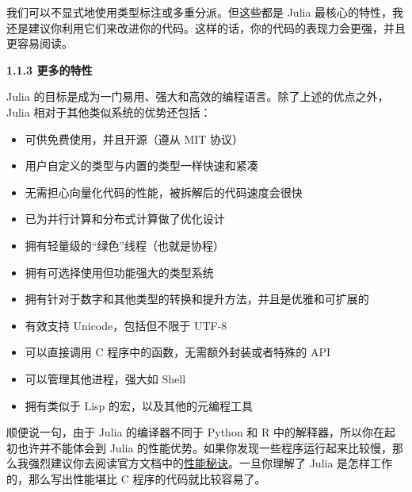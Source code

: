 我们可以不显式地使用类型标注或多重分派。但这些都是 Julia 最核心的特性，我还是建议你利用它们来改进你的代码。这样的话，你的代码的表现力会更强，并且更容易阅读。

\textbf{1.1.3 更多的特性}

Julia 的目标是成为一门易用、强大和高效的编程语言。除了上述的优点之外，Julia 相对于其他类似系统的优势还包括：

\begin{itemize}
\item 可供免费使用，并且开源（遵从 MIT 协议）
\item 用户自定义的类型与内置的类型一样快速和紧凑
\item 无需担心向量化代码的性能，被拆解后的代码速度会很快
\item 已为并行计算和分布式计算做了优化设计
\item 拥有轻量级的“绿色”线程（也就是协程）
\item 拥有可选择使用但功能强大的类型系统
\item 拥有针对于数字和其他类型的转换和提升方法，并且是优雅和可扩展的
\item 有效支持 Unicode，包括但不限于 UTF-8
\item 可以直接调用 C 程序中的函数，无需额外封装或者特殊的 API
\item 可以管理其他进程，强大如 Shell
\item 拥有类似于 Lisp 的宏，以及其他的元编程工具
\end{itemize}

顺便说一句，由于 Julia 的编译器不同于 Python 和 R 中的解释器，所以你在起初也许并不能体会到 Julia 的性能优势。如果你发现一些程序运行起来比较慢，那么我强烈建议你去阅读官方文档中的\href{https://docs.julialang.org/en/v1.3/manual/performance-tips/#man-performance-tips-1}{性能秘诀}。一旦你理解了 Julia 是怎样工作的，那么写出性能堪比 C 程序的代码就比较容易了。
